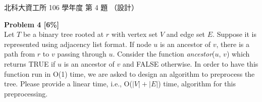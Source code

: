 \begin{pastexam}[label={px:ntut-106-prog-04}]{北科大資工所 106 學年度 第 4 題}
（設計）

\textbf{Problem 4 [6\%]}\\
Let $T$ be a binary tree rooted at $r$ with vertex set $V$ and edge set $E$. Suppose it is
represented using adjacency list format. If node $u$ is an ancestor of $v$, there is a path from
$r$ to $v$ passing through $u$. Consider the function \textit{ancestor}($u$, $v$) which returns TRUE
if $u$ is an ancestor of $v$ and FALSE otherwise. In order to have this function run in O(1) time,
we are asked to design an algorithm to preprocess the tree. Please provide a linear time, i.e.,
O($|V|+|E|$) time, algorithm for this preprocessing.
\end{pastexam}

